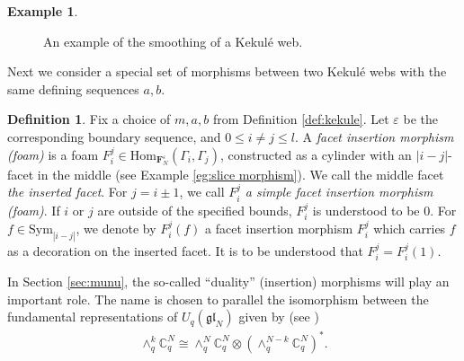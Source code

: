 \documentclass[12pt]{amsart}
\theoremstyle{definition}
\newtheorem{definition}[theorem]{Definition}
\newtheorem{example}[theorem]{Example}
\theoremstyle{remark}
\numberwithin{equation}{section}
\numberwithin{figure}{section}
\newcommand{\GL}{\mathfrak{gl}}
\newcommand{\Hom}{\mathrm{Hom}}
\newcommand{\Foam}{\mathbf{F}_N}
\begin{document}
\begin{example}
\begin{figure}[htbp]
{}
  \caption{An example of the smoothing of a Kekulé web.}
  \label{fig:EgSmoothing}
  \end{figure}
\end{example}

Next we consider a special set of morphisms between two Kekulé webs with the same defining sequences $a,b$.

\begin{definition}\label{def:slice morphism}
  Fix a choice of $m, a, b$ from Definition \ref{def:kekule}. Let $\varepsilon$ be the corresponding boundary sequence, and $0\leq i\neq j\leq l $. A \emph{facet insertion morphism (foam)} is a foam $F_i^j \in \Hom_{\Foam^\varepsilon}(\Gamma_i, \Gamma_j)$, constructed as a cylinder with an $|i-j|$-facet in the middle (see Example \ref{eg:slice morphism}). We call the middle facet \emph{the inserted facet}. For $j=i\pm 1$, we call $F_i^j$ \emph{a simple facet insertion morphism (foam)}. If $i$ or $j$ are outside of the specified bounds, $F_i^j$ is understood to be $0$. For $f \in \mathrm{Sym}_{|i-j|}$, we denote by $F_i^j(f)$ a facet insertion morphism $F_i^j$ which carries $f$ as a decoration on the inserted facet. It is to be understood that $F_i^j = F_i^j(1)$.
\end{definition} 

In Section \ref{sec:munu}, the so-called ``duality'' (insertion) morphisms will play an important role. The name is chosen to parallel the isomorphism between the fundamental representations of $U_q(\GL_N)$ given by (see \cite[Section 3.1]{CKM2014})
\begin{align*}
    \wedge_q^k\mathbb{C}_q^N \cong \wedge_q^N\mathbb{C}_q^N \otimes \left(\wedge_q^{N-k}\mathbb{C}_q^N\right)^*.
\end{align*}
\end{document}
